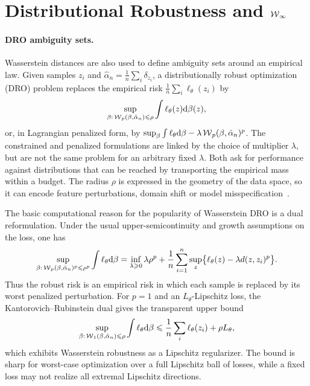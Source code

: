 \section{Distributional Robustness and \texorpdfstring{$\operatorname{\mathcal{W}}_\infty$}{W-infinity}}
\label{sec-dro-wasserstein-infinity}

\paragraph{DRO ambiguity sets.}

Wasserstein distances are also used to define ambiguity sets around an empirical law. Given samples $z_i$ and $\hat\alpha_n=\frac1n\sum_i\delta_{z_i}$, a distributionally robust optimization (DRO) problem replaces the empirical risk $\frac1n\sum_i \ell_\theta(z_i)$ by
\[
	\sup_{\beta:\,\operatorname{\mathcal{W}}_p(\beta,\hat\alpha_n)\leqslant \rho}
	\int \ell_\theta(z)\mathrm{d}\beta(z),
\]
or, in Lagrangian penalized form, by $\sup_\beta \int \ell_\theta\mathrm{d}\beta-\lambda\operatorname{\mathcal{W}}_p(\beta,\hat\alpha_n)^p$. The constrained and penalized formulations are linked by the choice of multiplier $\lambda$, but are not the same problem for an arbitrary fixed $\lambda$. Both ask for performance against distributions that can be reached by transporting the empirical mass within a budget. The radius $\rho$ is expressed in the geometry of the data space, so it can encode feature perturbations, domain shift or model misspecification~\cite{esfahani2018data,BlanchetMurthy2019,GaoKleywegt2016}.

The basic computational reason for the popularity of Wasserstein DRO is a dual reformulation. Under the usual upper-semicontinuity and growth assumptions on the loss, one has
\begin{equation}\label{eq-dro-dual-envelope}
	\sup_{\beta:\,\operatorname{\mathcal{W}}_p(\beta,\hat\alpha_n)^p\leqslant \rho^p}
	\int \ell_\theta\mathrm{d}\beta
	=
	\inf_{\lambda\geqslant0}
	\lambda\rho^p
	+
	\frac1n\sum_{i=1}^n
	\sup_z\bigl\{\ell_\theta(z)-\lambda d(z,z_i)^p\bigr\}.
\end{equation}
Thus the robust risk is an empirical risk in which each sample is replaced by its worst penalized perturbation. For $p=1$ and an $L_\theta$-Lipschitz loss, the Kantorovich--Rubinstein dual gives the transparent upper bound
\[
	\sup_{\beta:\,\operatorname{\mathcal{W}}_1(\beta,\hat\alpha_n)\leqslant \rho}
	\int \ell_\theta\mathrm{d}\beta
	\leqslant
	\frac1n\sum_i\ell_\theta(z_i)+\rho L_\theta,
\]
which exhibits Wasserstein robustness as a Lipschitz regularizer. The bound is sharp for worst-case optimization over a full Lipschitz ball of losses, while a fixed loss may not realize all extremal Lipschitz directions.


